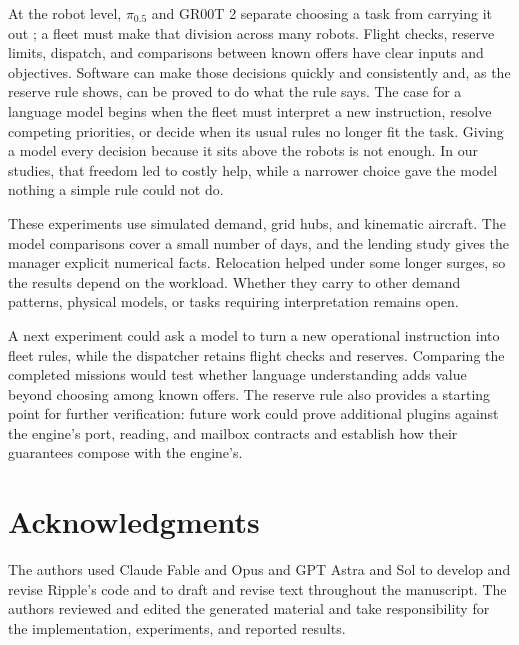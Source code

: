 \documentclass[letterpaper,10pt,conference]{ieeeconf}
\begin{document}
At the robot level, $\pi_{0.5}$ and GR00T 2 separate choosing a task
from carrying it out \cite{black2025pi05,nvidia2026gr00t2}; a fleet must
make that division across many robots.
Flight checks, reserve limits, dispatch, and comparisons between known
offers have clear inputs and objectives. Software can make those
decisions quickly and consistently and, as the reserve rule shows, can be
proved to do what the rule says. The case for a language model begins
when the fleet must interpret a new instruction, resolve competing
priorities, or decide when its usual rules no longer fit the task.
Giving a model every decision because it sits above the robots is not
enough. In our studies, that freedom led to costly help, while a
narrower choice gave the model nothing a simple rule could not do.

These experiments use simulated demand, grid hubs, and kinematic
aircraft. The model comparisons cover a small number of days, and the
lending study gives the manager explicit numerical facts. Relocation
helped under some longer surges, so the results depend on the workload.
Whether they carry to other demand patterns, physical models, or tasks
requiring interpretation remains open.

A next experiment could ask a model to turn a new operational instruction
into fleet rules, while the dispatcher retains flight checks and reserves.
Comparing the completed missions would test whether language understanding
adds value beyond choosing among known offers. The reserve rule also
provides a starting point for further verification: future work could
prove additional plugins against the engine's port, reading, and mailbox
contracts and establish how their guarantees compose with the engine's.

\section*{Acknowledgments}
The authors used Claude Fable and Opus and GPT Astra and Sol to develop
and revise Ripple's code and to draft and revise text throughout the
manuscript. The authors reviewed and edited the generated material and
take responsibility for the implementation, experiments, and reported
results.



\end{document}
